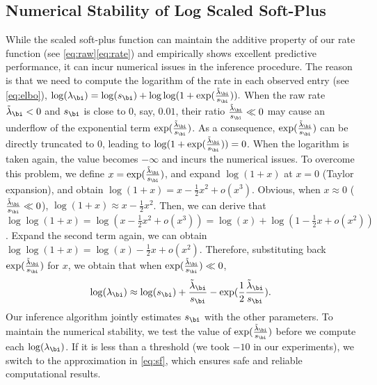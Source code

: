  

\subsection{Numerical Stability of Log Scaled Soft-Plus}
While the scaled soft-plus function can maintain the additive property of our rate function (see \eqref{eq:raw}\eqref{eq:rate}) and empirically shows excellent predictive performance, it can incur numerical issues in the inference procedure. The reason is that we need to compute the logarithm of the rate in each observed entry (see \eqref{eq:elbo}), $\log(\lambda_\bi) = \log(s_\bi) + \log \log (1 + \exp(\frac{\tilde{\lambda}_\bi}{s_\bi})).$
When the raw rate $\tilde{\lambda}_\bi <0$ and $s_\bi$ is close to $0$, say, $0.01$,  their ratio $\frac{\tilde{\lambda}_\bi}{s_\bi} \ll 0$ may cause an underflow of the exponential term $\exp(\frac{\tilde{\lambda}_\bi}{s_\bi})$. As a consequence, $\exp(\frac{\tilde{\lambda}_\bi}{s_\bi})$ can be directly truncated to $0$, leading to  $\log (1 + \exp(\frac{\tilde{\lambda}_\bi}{s_\bi}))=0$. When the logarithm is taken again, the value becomes $-\infty$ and incurs the numerical issues. To overcome this problem, we define $x=\exp(\frac{\tilde{\lambda}_\bi}{s_\bi})$, and expand $\log(1+x)$ at $x = 0$ (Taylor expansion), and obtain  $\log(1+x) = x - \frac{1}{2}x^2 + o(x^3)$. Obvious, when $x\approx 0$ (\ie $\frac{\tilde{\lambda}_\bi}{s_\bi} \ll 0$), $\log(1+x) \approx x - \frac{1}{2}x^2$. Then, we can derive that $\log\log (1+x) = \log( x - \frac{1}{2}x^2 + o(x^3)) = \log(x) + \log(1 - \frac{1}{2}x + o(x^2))$. Expand the second term again, we can obtain $\log\log(1+x) = \log(x) - \frac{1}{2}x + o(x^2)$. Therefore, substituting back $\exp(\frac{\tilde{\lambda}_\bi}{s_\bi})$ for $x$, we obtain that when $\exp(\frac{\tilde{\lambda}_\bi}{s_\bi}) \ll 0$,
\begin{align}
\log(\lambda_\bi) \approx \log(s_\bi) + \frac{\tilde{\lambda}_\bi}{s_\bi} - \exp(\frac{1}{2}\frac{\tilde{\lambda}_\bi}{s_\bi}). \label{eq:sf}
\end{align}
Our inference algorithm jointly estimates $s_\bi$ with the other parameters. To maintain the numerical stability, we test the value  of $\exp(\frac{\tilde{\lambda}_\bi}{s_\bi})$ before we compute each $\log(\lambda_\bi)$. If it is less than a threshold (we took $-10$ in our experiments), we switch to the approximation in \eqref{eq:sf}, which ensures safe and reliable computational results. 

